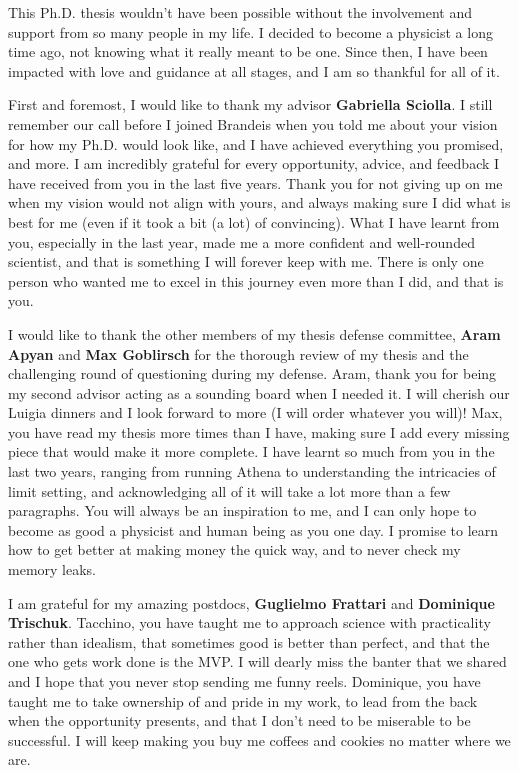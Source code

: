 This Ph.D. thesis wouldn't have been possible without the involvement and support from so many people in my life. I decided to become a physicist a long time ago, not knowing what it really meant to be one. Since then, I have been impacted with love and guidance at all stages, and I am so thankful for all of it.

First and foremost, I would like to thank my advisor \textbf{Gabriella Sciolla}. I still remember our call before I joined Brandeis when you told me about your vision for how my Ph.D. would look like, and I have achieved everything you promised, and more. I am incredibly grateful for every opportunity, advice, and feedback I have received from you in the last five years. Thank you for not giving up on me when my vision would not align with yours, and always making sure I did what is best for me (even if it took a bit (a lot) of convincing). What I have learnt from you, especially in the last year, made me a more confident and well-rounded scientist, and that is something I will forever keep with me. There is only one person who wanted me to excel in this journey even more than I did, and that is you.

I would like to thank the other members of my thesis defense committee, \textbf{Aram Apyan} and \textbf{Max Goblirsch} for the thorough review of my thesis and the challenging round of questioning during my defense. Aram, thank you for being my second advisor acting as a sounding board when I needed it. I will cherish our Luigia dinners and I look forward to more (I will order whatever you will)! Max, you have read my thesis more times than I have, making sure I add every missing piece that would make it more complete. I have learnt so much from you in the last two years, ranging from running Athena to understanding the intricacies of limit setting, and acknowledging all of it will take a lot more than a few paragraphs. You will always be an inspiration to me, and I can only hope to become as good a physicist and human being as you one day. I promise to learn how to get better at making money the quick way, and to never check my memory leaks.

I am grateful for my amazing postdocs, \textbf{Guglielmo Frattari} and \textbf{Dominique Trischuk}. Tacchino, you have taught me to approach science with practicality rather than idealism, that sometimes good is better than perfect, and that the one who gets work done is the MVP. I will dearly miss the banter that we shared and I hope that you never stop sending me funny reels. Dominique, you have taught me to take ownership of and pride in my work, to lead from the back when the opportunity presents, and that I don't need to be miserable to be successful. I will keep making you buy me coffees and cookies no matter where we are.

